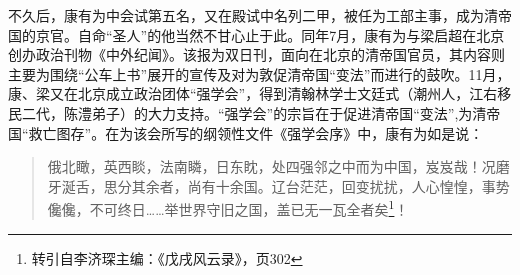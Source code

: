 不久后，康有为中会试第五名，又在殿试中名列二甲，被任为工部主事，成为清帝国的京官。自命“圣人”的他当然不甘心止于此。同年7月，康有为与梁启超在北京创办政治刊物《中外纪闻》。该报为双日刊，面向在北京的清帝国官员，其内容则主要为围绕“公车上书”展开的宣传及对为敦促清帝国“变法”而进行的鼓吹。11月，康、梁又在北京成立政治团体“强学会”，得到清翰林学士文廷式（潮州人，江右移民二代，陈澧弟子）的大力支持。“强学会”的宗旨在于促进清帝国“变法”,为清帝国“救亡图存”。在为该会所写的纲领性文件《强学会序》中，康有为如是说：

\begin{quote}

俄北瞰，英西睒，法南瞵，日东眈，处四强邻之中而为中国，岌岌哉！况磨牙涎舌，思分其余者，尚有十余国。辽台茫茫，回变扰扰，人心惶惶，事势儳儳，不可终日……举世界守旧之国，盖已无一瓦全者矣\footnote{转引自李济琛主编：《戊戌风云录》，页302}！

\end{quote}
	

